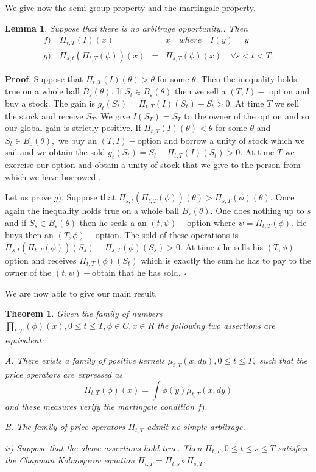 \documentclass[a4paper]{article}
\newtheorem{theorem}{Theorem}[section]
\newtheorem{lemma}{Lemma}[section]
\begin{document}
We give now the semi-group property and the martingale property.

\begin{lemma}
Suppose that there is no arbitrage opportunity.. Then
\begin{eqnarray*}
f)\quad \Pi _{t,T}(I)(x) &=&x\quad where\quad I(y)=y \\
g)\quad \Pi _{s,t}(\Pi _{t,T}(\phi ))(x) &=&\Pi _{s,T}(\phi )(x)\quad
\forall s<t<T.
\end{eqnarray*}
\end{lemma}

\textbf{Proof}. Suppose that $\Pi _{t,T}(I)(\theta )>\theta $ for some $%
\theta .$ Then the inequality holds true on a whole ball $B_{\varepsilon
}(\theta ).$ If $S_{t}\in B_{\varepsilon }(\theta )$ then we sell a $(T,I)-$%
option and buy a stock. The gain is $g_{t}(S_{t})=\Pi
_{t,T}(I)(S_{t})-S_{t}>0.$ At time $T$ we sell the stock and receive $S_{T}.$%
We give $I(S_{T})=S_{T}$ to the owner of the option and so our global gain
is strictly positive. If $\Pi _{t,T}(I)(\theta )<\theta $ for some $\theta $
and $S_{t}\in B_{\varepsilon }(\theta ),$ we buy an $(T,I)-$option and
borrow a unity of stock which we sail and we obtain the sold $%
g_{t}(S_{t})=S_{t}-\Pi _{t,T}(I)(S_{t})>0.$ At time $T$ we exercise our
option and obtain a unity of stock that we give to the person from which we
have borrowed..

Let us prove $g).$ Suppose that $\Pi _{s,t}(\Pi _{t,T}(\phi ))(\theta )>\Pi
_{s,T}(\phi )(\theta ).$ Once again the inequality holds true on a whole
ball $B_{\varepsilon }(\theta ).$ One does nothing up to $s$ and if $%
S_{s}\in B_{\varepsilon }(\theta )$ then he seals a an $(t,\psi )-$option
where $\psi =\Pi _{t,T}(\phi ).$ He buys then an $(T,\phi )-$option. The
sold of these operations is $\Pi _{s,t}(\Pi _{t,T}(\phi ))(S_{s})-\Pi
_{s,T}(\phi )(S_{s})>0.$ At time $t$ he sells his $(T,\phi )-$option and
receives $\Pi _{t,T}(\phi )(S_{t})$ which is exactly the sum he has to pay
to the owner of the $(t,\psi )-$obtain that he has sold. $\square $

We are now able to give our main result.

\begin{theorem}
Given the family of numbers $\prod_{t,T}(\phi )(x),0\leq t\leq T,\phi \in
C,x\in R$ the following two assertions are equivalent:

A. There exists a family of positive kernels $\mu _{t,T}(x,dy),0\leq t\leq
T, $ such that the price operators are expressed as
\[
\Pi _{t,T}(\phi )(x)=\int \phi (y)\mu _{t,T}(x,dy)
\]
and these measures verify the martingale condition $f).$

B. The family of price operators $\Pi _{t,T}$ admit no simple arbitrage.

ii) Suppose that the above assertions hold true. Then $\Pi _{t,T},0\leq
t\leq s\leq T$ satisfies the Chapman Kolmogorov equation $\Pi _{t,T}=\Pi
_{t,s}\circ \Pi _{s,T}.$
\end{theorem}
\end{document}
